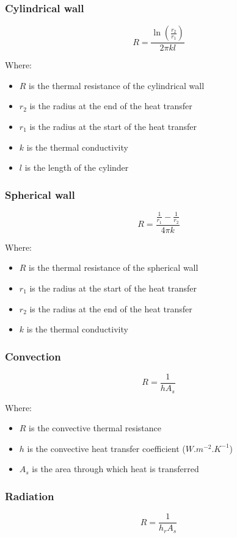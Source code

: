 \documentclass[11pt]{article}
\begin{document}
\subsubsection{Cylindrical wall}
\label{sec:org3a443c7}
\[R = \frac{\ln \left(\frac{r_2}{r_1} \right)}{2 \pi k l}\]

Where:
\begin{itemize}
\item \(R\) is the thermal resistance of the cylindrical wall
\item \(r_2\) is the radius at the end of the heat transfer
\item \(r_1\) is the radius at the start of the heat transfer
\item \(k\) is the thermal conductivity
\item \(l\) is the length of the cylinder
\end{itemize}
\subsubsection{Spherical wall}
\label{sec:orgaed4d75}
\[R = \frac{\frac{1}{r_1} - \frac{1}{r_2}}{4 \pi k}\]

Where:
\begin{itemize}
\item \(R\) is the thermal resistance of the spherical wall
\item \(r_1\) is the radius at the start of the heat transfer
\item \(r_2\) is the radius at the end of the heat transfer
\item \(k\) is the thermal conductivity
\end{itemize}
\subsubsection{Convection}
\label{sec:org817e56c}
\[R = \frac{1}{hA_s}\]

Where:
\begin{itemize}
\item \(R\) is the convective thermal resistance
\item \(h\) is the convective heat transfer coefficient (\(\unit{W.m^{-2}.K^{-1}}\))
\item \(A_s\) is the area through which heat is transferred
\end{itemize}
\subsubsection{Radiation}
\label{sec:org3c01150}
\[R = \frac{1}{h_r A_s}\]
\end{document}
